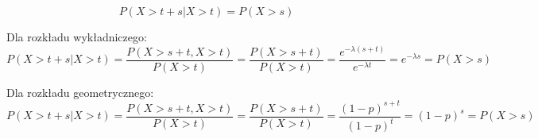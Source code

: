 \medskip
{} 

$$
P(X > t+s | X > t ) = P(X > s)
$$


Dla rozkładu wykładniczego:
$$
P(X > t+s | X > t ) = \frac{P(X > s + t, X > t)}{P(X > t)} = \frac{P(X > s + t)}{P(X > t)} = \frac{e^{-\lambda(s + t)}}{e^{-\lambda t}} = e^{-\lambda s} = P(X > s)
$$

Dla rozkładu geometrycznego:
$$
P(X > t+s | X > t ) = \frac{P(X > s + t, X > t)}{P(X > t)} = \frac{P(X > s + t)}{P(X > t)} = \frac{(1-p)^{s + t}}{(1-p)^{t}} = (1-p)^{s} = P(X > s)
$$
